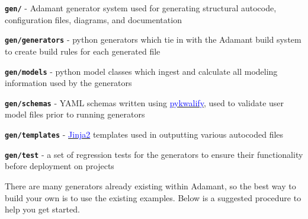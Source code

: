 \vspace{5mm} %
\begin{spaceditemize}
  \item \textbf{\texttt{gen/}} - Adamant generator system used for generating structural autocode, configuration files, diagrams, and documentation 
  \item \textbf{\texttt{gen/generators}} - python generators which tie in with the Adamant build system to create build rules for each generated file
  \item \textbf{\texttt{gen/models}} - python model classes which ingest and calculate all modeling information used by the generators
  \item \textbf{\texttt{gen/schemas}} - YAML schemas written using \href{https://pykwalify.readthedocs.io/en/unstable/}{\textcolor{blue}{pykwalify}}, used to validate user model files prior to running generators
  \item \textbf{\texttt{gen/templates}} - \href{http://jinja.pocoo.org}{\textcolor{blue}{Jinja2}} templates used in outputting various autocoded files
  \item \textbf{\texttt{gen/test}} - a set of regression tests for the generators to ensure their functionality before deployment on projects
\end{spaceditemize}
\vspace{5mm} %

There are many generators already existing within Adamant, so the best way to build your own is to use the existing examples. Below is a suggested procedure to help you get started.

